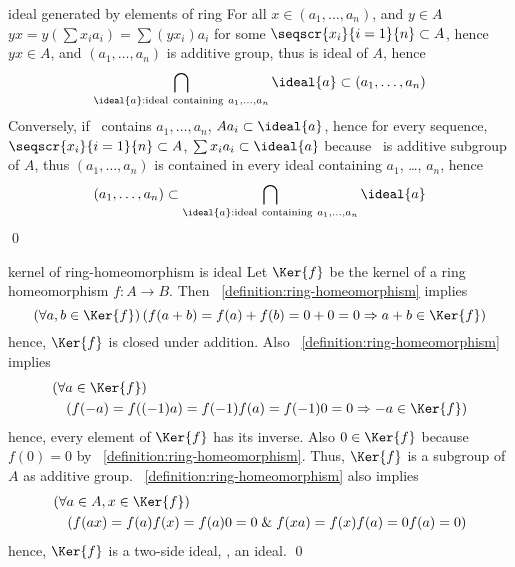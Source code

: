 \documentclass[17pt,landscape]{foils}
\begin{document}
{{{\begin{myproof}{ideal generated by elements of ring}
	For all $x\in (a_1,\ldots,a_n)$, and $y\in A$
	$yx = y\left(\sum x_i a_i\right) = \sum (yx_i)a_i$ for some $\seqscr{x_i}{i=1}{n} \subset A$,
	hence $yx\in A$,
	and $(a_1,\ldots, a_n)$ is additive group,
	thus is ideal of $A$,
	hence
	$$
		\bigcap_{\ideal{a}: \mathrm{ideal\ containing\ }a_1,\ldots,a_n} \ideal{a}
		\subset (a_1,\ldots,a_n)
	$$
	Conversely, if \ contains $a_1,\ldots,a_n$,
	$A a_i \subset \ideal{a}$,
	hence for every sequence, $\seqscr{x_i}{i=1}{n}\subset A$,
	$\sum x_i a_i\subset \ideal{a}$ because \ is additive subgroup of $A$,
	thus $(a_1,\ldots,a_n)$ is contained in every ideal containing $a_1$, \ldots, $a_n$,
	hence
	$$
		(a_1,\ldots,a_n)
		\subset
		\bigcap_{\ideal{a}: \mathrm{ideal\ containing\ }a_1,\ldots,a_n} \ideal{a}
	$$
	\qed\
\end{myproof}

\begin{myproof}{kernel of ring-homeomorphism is ideal}
	Let $\Ker{f}$ be the kernel of a ring homeomorphism $f:A\to B$.
	Then ~\ref{definition:ring-homeomorphism} implies
	\[
		\left(
			\forall a, b \in \Ker{f}
		\right)
		\left(
			f(a+b) = f(a) + f(b) = 0 + 0 = 0
			\Rightarrow
			a+b\in\Ker{f}
		\right)
	\]
	hence, $\Ker{f}$ is closed under addition.
	Also ~\ref{definition:ring-homeomorphism} implies
	\begin{eqnarray*}
		\lefteqn{
			\left(
				\forall a \in \Ker{f}
			\right)
		}
		\\
		&&
		\left(
			f(-a) = f((-1)a) = f(-1)f(a) = f(-1) 0 = 0
			\Rightarrow
			-a\in\Ker{f}
		\right)
	\end{eqnarray*}
	hence, every element of $\Ker{f}$ has its inverse.
	Also
	$0\in\Ker{f}$ because $f(0)=0$ by ~\ref{definition:ring-homeomorphism}.
	Thus, $\Ker{f}$ is a subgroup of $A$ as additive group.
	~\ref{definition:ring-homeomorphism} also implies
	\begin{eqnarray*}
		\lefteqn{
		\left(
			\forall a \in A, x \in \Ker{f}
		\right)
		}
		\\
		&&
		\left(
			f(ax) = f(a) f(x) = f(a) 0 = 0
			\;\& \;
			f(xa) = f(x) f(a) = 0 f(a) = 0
		\right)
	\end{eqnarray*}
	hence,
	$\Ker{f}$ is a two-side ideal, \ie, an ideal.
	\qed
\end{myproof}

}}}
\end{document}
